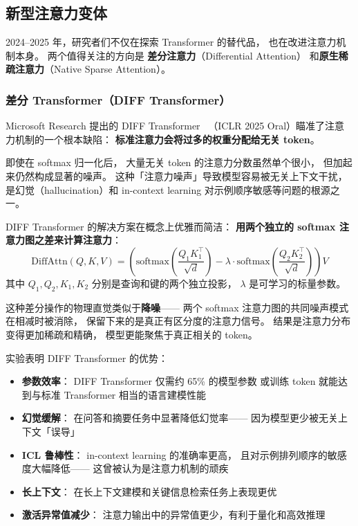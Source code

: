 \subsection{新型注意力变体}
\label{sec:new-attention-variants}

2024--2025 年，研究者们不仅在探索 Transformer 的替代品，
也在改进注意力机制本身。
两个值得关注的方向是
\textbf{差分注意力}（Differential Attention）
和\textbf{原生稀疏注意力}（Native Sparse Attention）。

\subsubsection{差分 Transformer（DIFF Transformer）}

Microsoft Research 提出的 DIFF Transformer~\cite{ye2024diff}
（ICLR 2025 Oral）瞄准了注意力机制的一个根本缺陷：
\textbf{标准注意力会将过多的权重分配给无关 token}。

即使在 softmax 归一化后，
大量无关 token 的注意力分数虽然单个很小，
但加起来仍然构成显著的噪声。
这种「注意力噪声」导致模型容易被无关上下文干扰，
是幻觉（hallucination）和 in-context learning
对示例顺序敏感等问题的根源之一。

DIFF Transformer 的解决方案在概念上优雅而简洁：
\textbf{用两个独立的 softmax 注意力图之差来计算注意力}：
\begin{equation}
  \mathrm{DiffAttn}(Q, K, V) =
  \left(\mathrm{softmax}\!\left(\frac{Q_1 K_1^\top}{\sqrt{d}}\right)
  - \lambda \cdot \mathrm{softmax}\!\left(\frac{Q_2 K_2^\top}{\sqrt{d}}\right)\right) V
\end{equation}
其中 $Q_1, Q_2, K_1, K_2$ 分别是查询和键的两个独立投影，
$\lambda$ 是可学习的标量参数。

这种差分操作的物理直觉类似于\textbf{降噪}——
两个 softmax 注意力图的共同噪声模式在相减时被消除，
保留下来的是真正有区分度的注意力信号。
结果是注意力分布变得更加稀疏和精确，
模型更能聚焦于真正相关的 token。

实验表明 DIFF Transformer 的优势：
\begin{itemize}[noitemsep]
  \item \textbf{参数效率}：
        DIFF Transformer 仅需约 65\% 的模型参数
        或训练 token 就能达到与标准 Transformer 相当的语言建模性能
  \item \textbf{幻觉缓解}：
        在问答和摘要任务中显著降低幻觉率——
        因为模型更少被无关上下文「误导」
  \item \textbf{ICL 鲁棒性}：
        in-context learning 的准确率更高，
        且对示例排列顺序的敏感度大幅降低——
        这曾被认为是注意力机制的顽疾
  \item \textbf{长上下文}：
        在长上下文建模和关键信息检索任务上表现更优
  \item \textbf{激活异常值减少}：
        注意力输出中的异常值更少，有利于量化和高效推理
\end{itemize}

